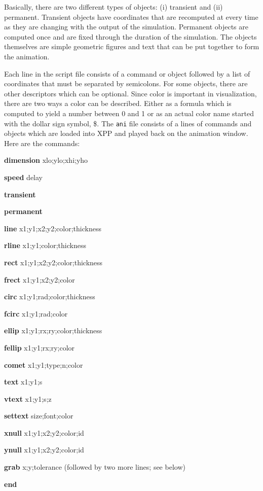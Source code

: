 \documentclass{article}
\begin{document}
Basically,
there are two different types of objects: (i) transient and (ii)
permanent. Transient objects have coordinates that are recomputed at
every time as they are changing with the output of the
simulation. Permanent objects are computed once and are fixed through
the duration of the simulation. The objects themselves are simple
geometric figures and text that can be put together to form the
animation.

Each line in the script file consists of a command or object followed
by a list of coordinates that must be separated by semicolons. For
some objects, there are other descriptors which can be optional.
Since color is important in visualization, there are two ways a color
can be described. Either as a formula which is computed to yield a
number between 0 and 1 or as an actual color name started with the
dollar sign symbol, \$. The {\tt ani} file consists of a lines of
commands and objects which are loaded into XPP and played back on the
animation window. Here are the commands:
\begin{description}
\item{\bf dimension} xlo;ylo;xhi;yho
\item{\bf speed} delay
\item{\bf transient}
\item{\bf permanent}
\item{\bf line} x1;y1;x2;y2;color;thickness
\item{\bf rline} x1;y1;color;thickness
\item{\bf rect} x1;y1;x2;y2;color;thickness
\item{\bf frect} x1;y1;x2;y2;color
\item{\bf circ} x1;y1;rad;color;thickness
\item{\bf fcirc} x1;y1;rad;color
\item{\bf ellip} x1;y1;rx;ry;color;thickness
\item{\bf fellip} x1;y1;rx;ry;color
\item{\bf comet} x1;y1;type;n;color
\item{\bf text} x1;y1;s
\item{\bf vtext} x1;y1;s;z
\item{\bf settext} size;font;color
\item{\bf xnull} x1;y1;x2;y2;color;id
\item{\bf ynull} x1;y1;x2;y2;color;id
\item{\bf grab} x;y;tolerance (followed by two more lines; see below)
\item{\bf end}
\end{description}
\end{document}
